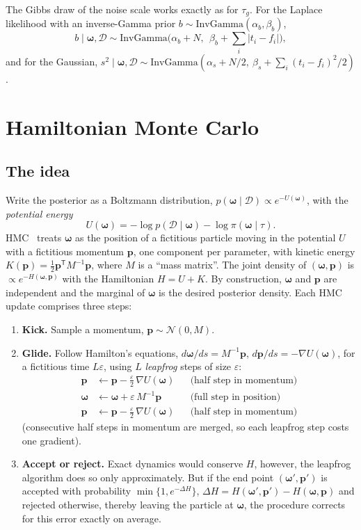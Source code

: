 \documentclass[11pt]{article}
\newcommand{\bw}{\boldsymbol{\omega}}
\newcommand{\bp}{\boldsymbol{p}}
\newcommand{\data}{\mathcal{D}}
\begin{document}
\noindent The Gibbs draw of the noise scale works exactly as for $\tau_g$. For the
Laplace likelihood with an inverse-Gamma prior $b \sim \text{InvGamma}(\alpha_b, \beta_b)$,
\[
  b \mid \bw, \data \sim \text{InvGamma}\Big(\alpha_b + N,\ \ \beta_b + \sum_i \lvert t_i - f_i\rvert\Big),
\]
and for the Gaussian, $s^2 \mid \bw, \data \sim \text{InvGamma}(\alpha_s + N/2,\ \beta_s + \sum_i (t_i - f_i)^2/2)$.

\section{Hamiltonian Monte Carlo}
\label{sec:hmc}

\subsection{The idea}

Write the posterior as a Boltzmann distribution, $p(\bw \mid \data) \propto
e^{-U(\bw)}$, with the \emph{potential energy}
\begin{equation}
  U(\bw) = -\log p(\data \mid \bw) - \log \pi(\bw \mid \tau).
\end{equation}
HMC~\cite{duane1987,neal2011} treats $\bw$ as the position of a fictitious particle
moving in the potential $U$ with a fictitious momentum $\bp$, one component
per parameter, with kinetic energy $K(\bp) = \tfrac12 \bp^{\mathsf T} M^{-1} \bp$,
where $M$ is a ``mass matrix''. The joint density of $(\bw, \bp)$ is
$\propto e^{-H(\bw, \bp)}$ with the Hamiltonian $H = U + K$. By construction, $\bw$ and $\bp$ are independent and
the marginal of $\bw$ is the desired posterior density. Each HMC update comprises three steps:

\begin{enumerate}
  \item \textbf{Kick.} Sample a momentum, $\bp \sim \mathcal{N}(0, M)$.
  \item \textbf{Glide.} Follow Hamilton's equations, $d\bw/ds = M^{-1}\bp$,
    $d\bp/ds = -\nabla U(\bw)$, for a fictitious time $L\varepsilon$, using $L$
    \emph{leapfrog} steps of size $\varepsilon$:
    \begin{align*}
      \bp &\leftarrow \bp - \tfrac{\varepsilon}{2}\, \nabla U(\bw) && \text{(half step in momentum)}\\
      \bw &\leftarrow \bw + \varepsilon\, M^{-1}\bp && \text{(full step in position)}\\
      \bp &\leftarrow \bp - \tfrac{\varepsilon}{2}\, \nabla U(\bw) && \text{(half step in momentum)}
    \end{align*}
    (consecutive half steps in momentum are merged, so each leapfrog step costs one
    gradient).
  \item \textbf{Accept or reject.} Exact dynamics would conserve $H$,  however, the leapfrog algorithm does
    so only approximately. But if the end point $(\bw', \bp')$ is accepted with
    probability $\min\{1, e^{-\Delta H}\}$, $\Delta H = H(\bw', \bp') - H(\bw, \bp)$ and rejected otherwise, thereby leaving the particle at $\bw$, the procedure corrects for this error exactly on average. 
\end{enumerate}
\end{document}

